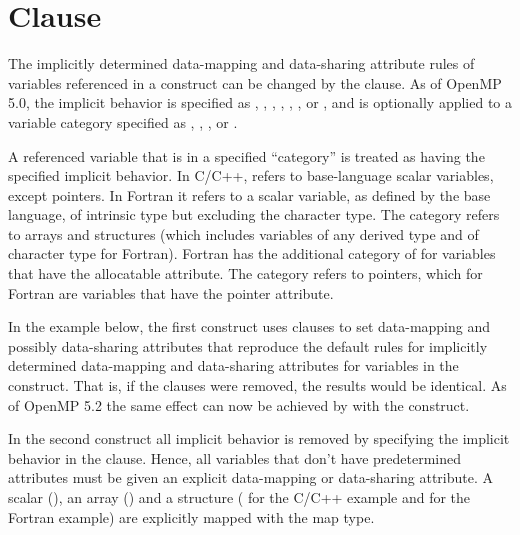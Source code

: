 \section{ Clause}
\label{sec:defaultmap}

The implicitly determined data-mapping and data-sharing attribute
rules of variables referenced in a  construct can be
changed by the  clause. 
As of OpenMP 5.0, the implicit behavior is specified as
, , , ,
, ,  or ,
and is optionally applied to a variable category specified as , , ,
or . 

A referenced variable that is in a specified ``category'' is treated as having
the specified implicit behavior. In C/C++,  refers to
base-language scalar variables, except pointers.  In Fortran it refers to a
scalar variable, as defined by the base language, of intrinsic type but
excluding the character type. The  category refers to arrays and
structures (which includes variables of any derived type and of character type for Fortran). Fortran
has the additional category of  for variables that have the
allocatable attribute. The  category refers to pointers, which
for Fortran are variables that have the pointer attribute.

In the example below, the first  construct uses  
clauses to set data-mapping and possibly data-sharing attributes that reproduce 
the default rules for implicitly determined data-mapping and data-sharing
attributes for variables in the construct. That is, if the 
clauses were removed, the results would be identical. As of OpenMP 5.2 
the same effect can now be achieved by  with 
the  construct.

In the second  construct all implicit behavior is removed
by specifying the  implicit behavior in the  clause.
Hence, all variables that don't have predetermined attributes must be given an
explicit data-mapping or data-sharing attribute. A scalar (), an
array () and a structure ( for the C/C++ example and
 for the Fortran example) are explicitly mapped with the
 map type.

